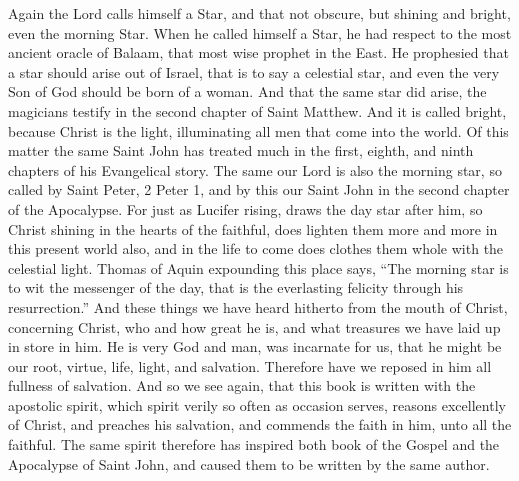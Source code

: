 Again the Lord calls himself a Star, and that not obscure, but shining and bright, even the morning Star. When he called himself a Star, he had respect to the most ancient oracle of Balaam, that most wise prophet in the East. He prophesied that a star should arise out of Israel, that is to say a celestial star, and even the very Son of God should be born of a woman. And that the same star did arise, the magicians testify in the second chapter of Saint Matthew. And it is called bright, because Christ is the light, illuminating all men that come into the world. Of this matter the same Saint John has treated much in the first, eighth, and ninth chapters of his Evangelical story. The same our Lord is also the morning star, so called by Saint Peter, 2 Peter 1, and by this our Saint John in the second chapter of the Apocalypse. For just as Lucifer rising, draws the day star after him, so Christ shining in the hearts of the faithful, does lighten them more and more in this present world also, and in the life to come does clothes them whole with the celestial light. Thomas of Aquin expounding this place says, “The morning star is to wit the messenger of the day, that is the everlasting felicity through his resurrection.” And these things we have heard hitherto from the mouth of Christ, concerning Christ, who and how great he is, and what treasures we have laid up in store in him. He is very God and man, was incarnate for us, that he might be our root, virtue, life, light, and salvation. Therefore have we reposed in him all fullness of salvation. And so we see again, that this book is written with the apostolic spirit, which spirit verily so often as occasion serves, reasons excellently of Christ, and preaches his salvation, and commends the faith in him, unto all the faithful. The same spirit therefore has inspired both book of the Gospel and the Apocalypse of Saint John, and caused them to be written by the same author.

